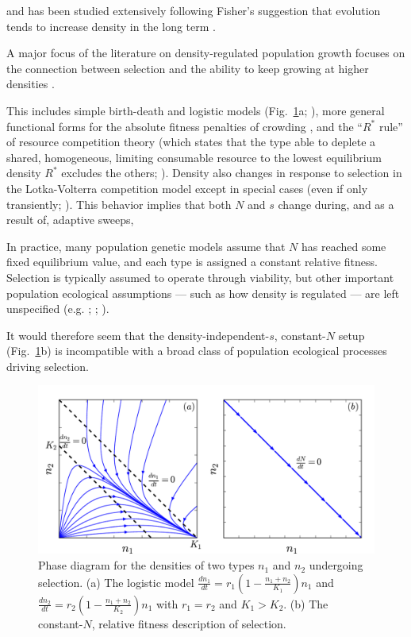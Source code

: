 \documentclass[12pt]{article}
\begin{document}
and has been studied extensively following Fisher's suggestion that evolution tends to increase density in the long term \citep{fisher_1930, macarthur_1962, roughgarden_1979, lande_2009}.

A major focus of the literature on density-regulated population growth focuses on the connection between selection and the ability to keep growing at higher densities  \citep{kostitzin_1939,macarthur_1967,roughgarden_1979,christiansen_2004}. 

This includes simple birth-death \citep{kostitzin_1939} and logistic models (Fig.~\ref{fig:Ksel}a; \citealt{macarthur_1962,kimura1969natural,roughgarden_1979,boyce_1984}), more general functional forms for the absolute fitness penalties of crowding \citep{kimura_1978,charlesworth_1971,lande_2009,nagylaki_1979}, and the ``$R^*$ rule'' of resource competition theory (which states that the type able to deplete a shared, homogeneous, limiting consumable resource to the lowest equilibrium density $R^*$ excludes the others; \citealt{grover_1997}). Density also changes in response to selection in the Lotka-Volterra competition model except in special cases (even if only transiently; \citealt{smouse_1976,mallet_2012}). This behavior implies that both $N$ and $s$ change during, and as a result of, adaptive sweeps, 

In practice, many population genetic models assume that $N$ has reached some fixed equilibrium value, and each type is assigned a constant relative fitness. Selection is typically assumed to operate through viability, but other important population ecological assumptions --- such as how density is regulated --- are left unspecified (e.g. \citealt{gillespie_2004}; \citealt{nagylaki_1992}; \citealt{ewens_2004}). 




 It would therefore seem that the density-independent-$s$, constant-$N$ setup (Fig.~\ref{fig:Ksel}b) is incompatible with a broad class of population ecological processes driving selection.

\begin{figure}
\centering
\includegraphics[scale=0.8]{Kplot.pdf}
\caption{\label{fig:Ksel} Phase diagram for the densities of two types $n_1$ and $n_2$ undergoing selection. (a) The logistic model $\frac{dn_1}{dt}=r_1(1-\frac{n_1+n_2}{K_1})n_1$ and $\frac{dn_2}{dt}=r_2(1-\frac{n_1+n_2}{K_2})n_1$ with $r_1=r_2$ and $K_1>K_2$. (b) The constant-$N$, relative fitness description of selection.}
\end{figure}
\end{document}
